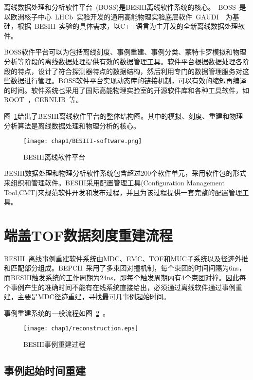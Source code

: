 离线数据处理和分析软件平台~\cite{liwd:2006}(BOSS)是BESIII离线软件系统的核心。~BOSS~是以欧洲核子中心~LHCb~实验开发的通用高能物理实验底层软件~GAUDI~~\cite{Barrand:2000}为基础，根据~BESIII~实验的具体需求，以C++语言为主开发的全新离线数据处理软件。

BOSS软件平台可以为包括离线刻度、事例重建、事例分类、蒙特卡罗模拟和物理分析等阶段的离线数据处理提供有效的数据管理工具。软件平台根据数据处理各阶段的特点，设计了符合探测器特点的数据结构，然后利用专门的数据管理服务对这些数据进行管理。BOSS软件平台实现动态库的链接机制，可以有效的缩短再编译的时间。软件系统也采用了国际高能物理实验室的开源软件库和各种工具软件，如ROOT~\cite{root}，CERNLIB~\cite{cern}等。


图~\ref{fig:BESIII-software}给出了BESIII离线软件平台的整体结构图。其中的模拟、刻度、重建和物理分析算法是离线数据处理和物理分析的核心。
\begin{figure}[!h]
  \centering
  \texttt{[image: chap1/BESIII-software.png]}
  \caption{BESIII离线软件平台}
  \label{fig:BESIII-software}
\end{figure}

BESIII数据处理和物理分析软件系统包含超过200个软件单元，采用软件包的形式来组织和管理软件。BESIII采用配置管理工具(Configuration Management Tool,CMT)来规范软件开发和发布过程，并且为该过程提供一套完整的配置管理工具。%

\section{端盖TOF数据刻度重建流程}
BESIII~离线事例重建软件系统由MDC、EMC、TOF和MUC子系统以及径迹外推和匹配部分组成。BEPCII~采用了多束团对撞机制，每个束团的时间间隔为6ns，而BESIII触发系统的工作周期为24ns，即每个触发周期内有4个束团对撞。因此每个事例产生的准确时间不能有在线系统直接给出，必须通过离线软件通过事例重建，主要是MDC径迹重建，寻找最可几事例起始时间。

事例重建系统的一般流程如图~\ref{fig:reconstruction}~。

\begin{figure}[!h]
  \centering
  \texttt{[image: chap1/reconstruction.eps]}
  \caption{BESIII事例重建过程}
  \label{fig:reconstruction}
\end{figure}

\subsection{事例起始时间重建}

